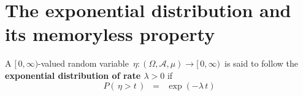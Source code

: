 

\section{The exponential distribution and its memoryless property}
\setcounter{theorem}{0}
\setcounter{equation}{0}


\renewcommand{\theenumi}{\roman{enumi}}
\renewcommand{\labelenumi}{\textnormal{(\theenumi)}$\;\;$}


\vskip 0.3cm
\begin{definition}
\mbox{}
\vskip 0.1cm
\noindent
A $[\,0,\infty)$-valued random variable
\,$\eta : (\Omega,\mathcal{A},\mu) \longrightarrow [\,0,\infty)$\,
is said to follow the \textbf{exponential distribution of rate $\lambda > 0$} if
\begin{equation*}
P\!\left(\,\eta > t\,\right) \;\; = \;\; \exp(-\lambda\,t)
\end{equation*}
\end{definition}


